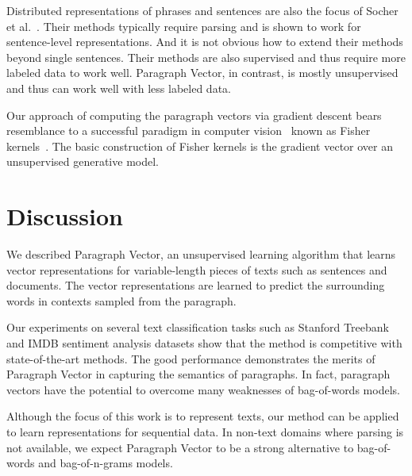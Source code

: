 \documentclass{article}
\begin{document}
Distributed representations of phrases and sentences are also the
focus of Socher et al.~\cite{socher11,socher11b,socher13}. Their
methods typically require parsing and is shown to work for
sentence-level representations. And it is not obvious how to extend
their methods beyond single sentences. Their methods are also
supervised and thus require more labeled data to work well. Paragraph
Vector, in contrast, is mostly unsupervised and thus can work well
with less labeled data.

Our approach of computing the paragraph vectors via gradient descent
bears resemblance to a successful paradigm in computer
vision~\cite{perronnin07,perronnin10} known as Fisher
kernels~\cite{jaakkola99}. The basic construction of Fisher kernels is
the gradient vector over an unsupervised generative model.  





\section{Discussion}
We described Paragraph Vector, an unsupervised learning algorithm that
learns vector representations for variable-length pieces of texts such
as sentences and documents. The vector representations are learned to
predict the surrounding words in contexts sampled from the paragraph.



Our experiments on several text classification tasks such as Stanford
Treebank and IMDB sentiment analysis datasets show that the method is
competitive with state-of-the-art methods. The good performance
demonstrates the merits of Paragraph Vector in capturing the semantics of
paragraphs. In fact, paragraph vectors have the potential to overcome
many weaknesses of bag-of-words models.

Although the focus of this work is to represent texts, our method can
be applied to learn representations for sequential data. In non-text
domains where parsing is not available, we expect Paragraph Vector to
be a strong alternative to bag-of-words and bag-of-n-grams models.




\end{document}
